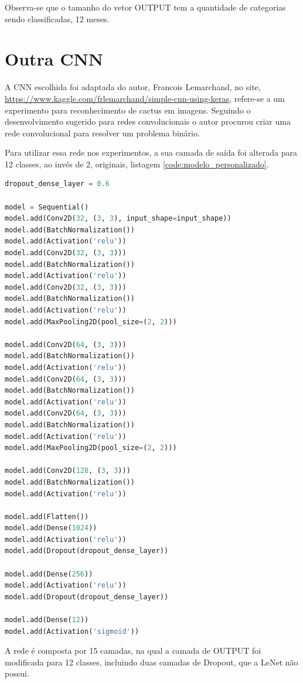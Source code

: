 \documentclass[12pt,
	english,			%
	french,				%
	spanish,			%
	brazil,				%
	]{article}
\begin{document}
Observa-se que o tamanho do vetor OUTPUT tem a quantidade de categorias sendo classificadas, 12 meses.

\section{Outra CNN}

A CNN escolhida foi adaptada do autor, Francois Lemarchand, no site, \url{https://www.kaggle.com/frlemarchand/simple-cnn-using-keras}, refere-se a um experimento para reconhecimento de cactus em imagens. Seguindo o desenvolvimento sugerido para redes convolucionais o autor procurou criar uma rede convolucional para resolver um problema binário. 

Para utilizar essa rede nos experimentos, a sua camada de saída foi alterada para 12 classes, ao invés de 2, originais, listagem \ref{code:modelo_personalizado}.

\begin{lstlisting}[caption={CNN escolhida},captionpos=b,frame=single,label={code:modelo_personalizado}, language=Python]
dropout_dense_layer = 0.6

model = Sequential()
model.add(Conv2D(32, (3, 3), input_shape=input_shape))
model.add(BatchNormalization())
model.add(Activation('relu'))
model.add(Conv2D(32, (3, 3)))
model.add(BatchNormalization())
model.add(Activation('relu'))
model.add(Conv2D(32, (3, 3)))
model.add(BatchNormalization())
model.add(Activation('relu'))
model.add(MaxPooling2D(pool_size=(2, 2)))

model.add(Conv2D(64, (3, 3)))
model.add(BatchNormalization())
model.add(Activation('relu'))
model.add(Conv2D(64, (3, 3)))
model.add(BatchNormalization())
model.add(Activation('relu'))
model.add(Conv2D(64, (3, 3)))
model.add(BatchNormalization())
model.add(Activation('relu'))
model.add(MaxPooling2D(pool_size=(2, 2)))

model.add(Conv2D(128, (3, 3)))
model.add(BatchNormalization())
model.add(Activation('relu'))

model.add(Flatten())
model.add(Dense(1024))
model.add(Activation('relu'))
model.add(Dropout(dropout_dense_layer))

model.add(Dense(256))
model.add(Activation('relu'))
model.add(Dropout(dropout_dense_layer))

model.add(Dense(12))
model.add(Activation('sigmoid'))
\end{lstlisting}

A rede é composta por 15 camadas, na qual a camada de OUTPUT foi modificada para 12 classes, incluindo duas camadas de Dropout, que a LeNet não possui.
\end{document}
